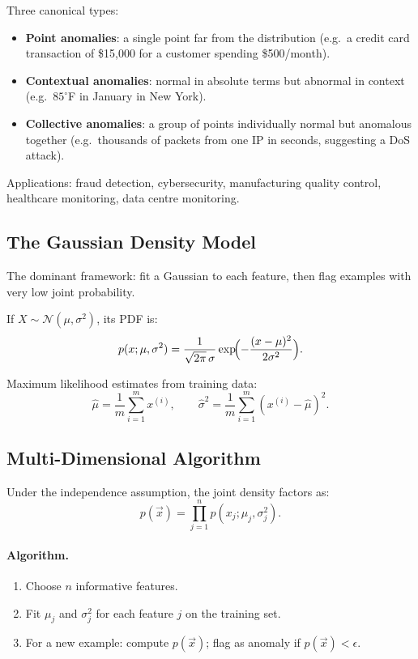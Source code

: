 Three canonical types:
\begin{itemize}
\item \textbf{Point anomalies}: a single point far from the distribution
  (e.g.\ a credit card transaction of \$15{,}000 for a customer spending
  \$500/month).
\item \textbf{Contextual anomalies}: normal in absolute terms but abnormal
  in context (e.g.\ $85^\circ$F in January in New York).
\item \textbf{Collective anomalies}: a group of points individually normal but
  anomalous together (e.g.\ thousands of packets from one IP in seconds,
  suggesting a DoS attack).
\end{itemize}

Applications: fraud detection, cybersecurity, manufacturing quality control,
healthcare monitoring, data centre monitoring.

\subsection{The Gaussian Density Model}

The dominant framework: fit a Gaussian to each feature, then flag examples
with very low joint probability.

If $X\sim\mathcal{N}(\mu,\sigma^2)$, its PDF is:
\[p(x;\mu,\sigma^2)=\frac{1}{\sqrt{2\pi}\,\sigma}
\exp\!\Bigl(-\frac{(x-\mu)^2}{2\sigma^2}\Bigr).\]

Maximum likelihood estimates from training data:
\[\hat{\mu}=\frac{1}{m}\sum_{i=1}^m x^{(i)},\qquad
\hat{\sigma}^2=\frac{1}{m}\sum_{i=1}^m(x^{(i)}-\hat{\mu})^2.\]

\subsection{Multi-Dimensional Algorithm}

Under the independence assumption, the joint density factors as:
\[p(\vec{x})=\prod_{j=1}^n p(x_j;\mu_j,\sigma_j^2).\]

\paragraph{Algorithm.}
\begin{enumerate}[label=\textbf{Step \arabic*:}]
\item Choose $n$ informative features.
\item Fit $\mu_j$ and $\sigma_j^2$ for each feature $j$ on the training set.
\item For a new example: compute $p(\vec{x})$; flag as anomaly if
  $p(\vec{x})<\epsilon$.
\end{enumerate}


